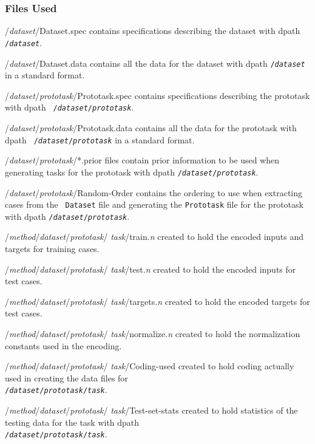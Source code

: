 \subsubsection*{Files Used}
\begin{ttdescription}
\item[/{\rm\em dataset\/}/Dataset.spec]
    contains specifications describing the dataset with dpath {\tt
    /{\rm\em dataset}}.
\item[/{\rm\em dataset\/}/Dataset.data]
    contains all the data for the dataset with dpath \texttt{/{\rm\em dataset}}
    in a \delve{} standard format.
\item[/{\rm\em dataset\/}/{\rm\em prototask\/}/Prototask.spec]
    contains specifications describing the prototask with dpath {\tt
    /{\rm\em dataset\/}/{\rm\em prototask}}.
\item[/{\rm\em dataset\/}/{\rm\em prototask\/}/Prototask.data]
    contains all the data for the prototask with dpath {\tt
    /{\rm\em dataset\/}/{\rm\em prototask}} in a \delve{} standard format.  
\item[/{\rm\em dataset\/}/{\rm\em prototask\/}/*.prior]
    files contain prior information to be used when generating tasks for the 
    prototask with dpath \texttt{/{\rm\em dataset\/}/{\rm\em prototask}}.
\item[/{\rm\em dataset\/}/{\rm\em prototask\/}/Random-Order]
    contains the ordering to use when extracting cases from the {\tt
    Dataset} file and generating the \texttt{Prototask} file for the
    prototask with dpath \texttt{/{\rm\em dataset\/}/{\rm\em prototask}}.
\item[/{\rm\em method\/}/{\rm\em dataset\/}/{\rm\em prototask\/}/{\rm\em 
    task\/}/train.\textit{n}]
    created to hold the encoded inputs and targets for training cases.
\item[/{\rm\em method\/}/{\rm\em dataset\/}/{\rm\em prototask\/}/{\rm\em 
    task\/}/test.\textit{n}]
    created to hold the encoded inputs for test cases.
\item[/{\rm\em method\/}/{\rm\em dataset\/}/{\rm\em prototask\/}/{\rm\em 
    task\/}/targets.\textit{n}]
    created to hold the encoded targets for test cases.
\item[/{\rm\em method\/}/{\rm\em dataset\/}/{\rm\em prototask\/}/{\rm\em 
    task\/}/normalize.\textit{n}]
    created to hold the normalization constants used in the encoding.
\item[/{\rm\em method\/}/{\rm\em dataset\/}/{\rm\em prototask\/}/{\rm\em 
    task\/}/Coding-used]
    created to hold coding actually used in creating the data files for \\
    \texttt{/{\rm\em dataset\/}/{\rm\em prototask\/}/{\rm\em task}}.
\item[/{\rm\em method\/}/{\rm\em dataset\/}/{\rm\em prototask\/}/{\rm\em 
    task\/}/Test-set-stats]
    created to hold statistics of the testing data for the task with dpath \\
    \texttt{/{\rm\em dataset\/}/{\rm\em prototask\/}/{\rm\em task}}.
\end{ttdescription}

